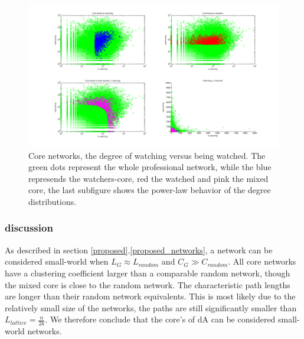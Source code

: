 \begin{figure}[htb]
  \centering
  \includegraphics[width=1\linewidth]{img/core.png}
  \caption{Core networks, the degree of watching versus being watched.  The green dots represent the whole professional network, while the blue represends the watchers-core, red the watched and pink the mixed core, the last subfigure shows the power-law behavior of the degree distributions.}
  \label{fig:results_core}
\end{figure}
\subsubsection{discussion}
As described in section \ref{proposed}.\ref{proposed_networks}, a network can be considered small-world when $L_G\approx L_{random}$ and $C_G \gg C_{random}$. All core networks have a clustering coefficient larger than a comparable random network, though the mixed core is close to the random network. The characteristic path lengths are longer than their random network equivalents. This is most likely due to the relatively small size of the networks, the paths are still significantly smaller than $L_{lattice}=\frac{n}{2k}$. We therefore conclude that the core's of dA can be considered small-world networks.  
